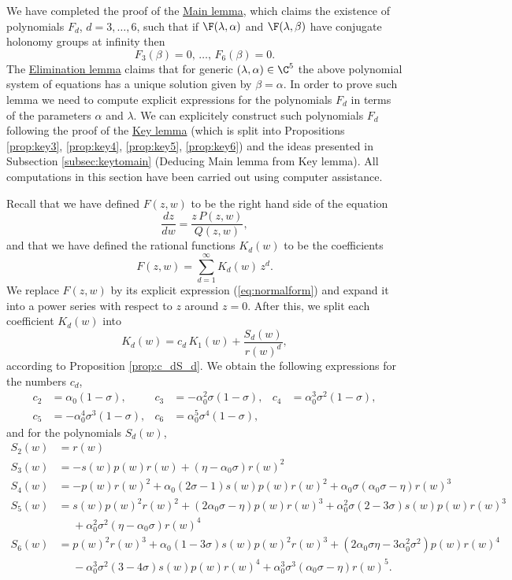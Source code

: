 

We have completed the proof of the \hyperref[lemma:main]{Main lemma}, which claims the existence of polynomials $F_d$, $d=3,\ldots,6$, such that if $\F(\lambda,\alpha)$ and $\F(\lambda,\beta)$ have conjugate holonomy groups at infinity then 
\begin{equation}\label{eq:polysystbis}
 F_3(\beta)=0,\,\ldots,\,F_6(\beta)=0.
\end{equation}
The \hyperref[lemma:elimination]{Elimination lemma} claims that for generic $(\lambda,\alpha)\in\C^5$ the above polynomial system of equations has a unique solution given by $\beta=\alpha$. In order to prove such lemma we need to compute explicit expressions for the polynomials $F_d$ in terms of the parameters $\alpha$ and $\lambda$. We can explicitely construct such polynomials $F_d$ following the proof of the \hyperref[lemma:key]{Key lemma} (which is split into  Propositions \ref{prop:key3}, \ref{prop:key4}, \ref{prop:key5}, \ref{prop:key6}) and the ideas presented in Subsection \ref{subsec:keytomain} (Deducing Main lemma from Key lemma). All computations in this section have been carried out using computer assistance.

Recall that we have defined $F(z,w)$ to be the right hand side of the equation
\begin{equation}\label{eq:ratdifeqbis}
 \frac{dz}{dw}=\frac{z\,P(z,w)}{Q(z,w)},
\end{equation}
and that we have defined the rational functions $K_d(w)$ to be the coefficients
\[ F(z,w)=\sum_{d=1}^{\infty}K_d(w)\,z^d. \]
We replace $F(z,w)$ by its explicit expression (\ref{eq:normalform}) and expand it into a power series with respect to $z$ around $z=0$. After this, we split each coefficient $K_d(w)$ into
\[ K_d(w)=c_d\,K_1(w)+\frac{S_d(w)}{r(w)^d}, \]
according to Proposition \ref{prop:c_dS_d}. We obtain the following expressions for the numbers $c_d$,
\begin{align*}
 c_2&=\alpha_0(1-\sigma), & c_3&=-\alpha_0^{2}\sigma(1-\sigma), & c_4&=\alpha_0^{3}\sigma^{2}(1-\sigma),\\
 c_5&=-\alpha_0^{4}\sigma^{3}(1-\sigma), & c_6&=\alpha_0^{5}\sigma^{4}(1-\sigma),
\end{align*}
and for the polynomials $S_d(w)$,
\begin{align*}
S_2(w) &= r(w) \\
S_3(w) &= -s(w)p(w)r(w) + (\eta-\alpha_0\sigma)r(w)^2 \\
S_4(w) &= -p(w)r(w)^2+\alpha_0(2\sigma-1)s(w)p(w)r(w)^2+\alpha_0\sigma(\alpha_0\sigma-\eta)r(w)^3 \\
S_5(w) &= s(w)p(w)^2r(w)^2+(2\alpha_0\sigma-\eta)p(w)r(w)^3+\alpha_0^2\sigma(2-3\sigma)s(w)p(w)r(w)^3\\
  &\phantom{=} +\alpha_0^2\sigma^2(\eta-\alpha_0\sigma)r(w)^4 \\
S_6(w) &= p(w)^2r(w)^3+\alpha_0(1-3\sigma)s(w)p(w)^2r(w)^3+(2\alpha_0\sigma\eta-3\alpha_0^2\sigma^2)p(w)r(w)^4\\
  &\phantom{=} -\alpha_0^3\sigma^2(3-4\sigma)s(w)p(w)r(w)^4+\alpha_0^3\sigma^3(\alpha_0\sigma-\eta)r(w)^5.
\end{align*}


